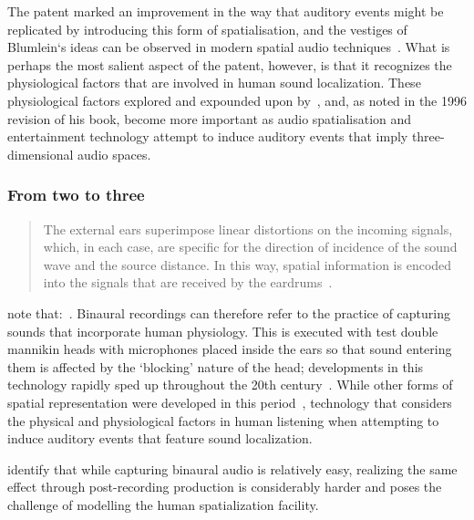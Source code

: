 The patent marked an improvement in the way that auditory events might be replicated by introducing this form of spatialisation, and the vestiges of Blumlein`s ideas can be observed in modern spatial audio techniques~\citep{spatial_techniques, beyer_acoustics}.
What is perhaps the most salient aspect of the patent, however, is that it recognizes the physiological factors that are involved in human sound localization.
These physiological factors explored and expounded upon by~\citet{blauert_spatial}, and, as noted in the 1996 revision of his book, become more important as audio spatialisation and entertainment technology attempt to induce auditory events that imply three-dimensional audio spaces.

\subsubsection{From two to three}

\begin{quotation}
    The external ears superimpose linear distortions on the incoming signals, which, in each case, are specific for the direction of incidence of the sound wave and the source distance.
    In this way, spatial information is encoded into the signals that are received by the eardrums~\citep{blauert_spatial}.
\end{quotation}

\citet{roginska2017immersive} note that:~.
Binaural recordings can therefore refer to the practice of capturing sounds that incorporate human physiology.
This is executed with test double mannikin heads with microphones placed inside the ears so that sound entering them is affected by the `blocking' nature of the head;
developments in this technology rapidly sped up throughout the 20th century~\citep{binaural_paul}.
While other forms of spatial representation were developed in this period~\citep{gerzon_periphony, noisternig_ambisonic, wave_field}, technology that considers the physical and physiological factors in human listening when attempting to induce auditory events that feature sound localization.

\citet{roginska2017immersive} identify that while capturing binaural audio is relatively easy, realizing the same effect through post-recording production is considerably harder and poses the challenge of modelling the human spatialization facility.

